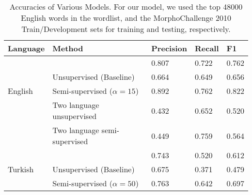 \documentclass[11pt,twocolumn]{article}
\begin{document}
\begin{table*}
    \begin{center}
        \begin{tabular}{ | l | l | l | l | l |}
            \hline
            Language & Method & Precision & Recall & F1 \\ \hline
                     & \citeauthor{Narasimhan15} & 0.807 & 0.722 & 0.762 \\ 
                     & Unsupervised (Baseline) & 0.664  & 0.649 & 0.656 \\ 
            English & Semi-supervised ($\alpha=15$) & 0.892 & 0.762 & 0.822 \\ 
                    & Two language unsupervised & 0.432 & 0.652 & 0.520 \\ 
                    & Two language semi-supervised & 0.449 & 0.759 & 0.564 \\ \hline
                    & \citeauthor{Narasimhan15} & 0.743 & 0.520 & 0.612 \\ 
            Turkish & Unsupervised (Baseline) & 0.675 & 0.371 & 0.479 \\ 
                    & Semi-supervised ($\alpha=50$) & 0.763 & 0.642 & 0.697 \\ \hline
        \end{tabular}
        \caption{Accuracies of Various Models. For our model, we used the top 48000 English words in the wordlist,
        and the MorphoChallenge 2010 Train/Development sets for training and testing, respectively.}
    \end{center}
\end{table*}
\end{document}

